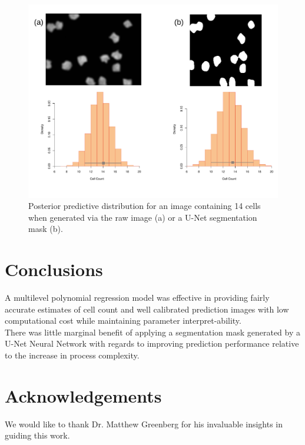 \documentclass[isoft]{poster_class_UofC}
\begin{document}
\begin{poster}
           \begin{figure}
            \centering
            \captionsetup{type=figure}
            \includegraphics[scale=1]{./images/PostPred.pdf}
            \caption{Posterior predictive distribution for an image containing 14 cells when generated via the raw image (a) or a U-Net segmentation mask (b).}
            \label{fig:PostPredDist}
        \end{figure}   
            
    
        \section{Conclusions}
A multilevel polynomial regression model was effective in providing fairly accurate estimates of cell count and well calibrated prediction images with low computational cost while maintaining parameter interpret-ability. \\

There was little marginal benefit of applying a segmentation mask generated by a U-Net Neural Network with regards to improving prediction performance relative to the increase in process complexity.
  
        \section{Acknowledgements}
We would like to thank Dr. Matthew Greenberg for his invaluable insights in guiding this work.  

        
        
    
    
    \end{poster}
\end{document}
